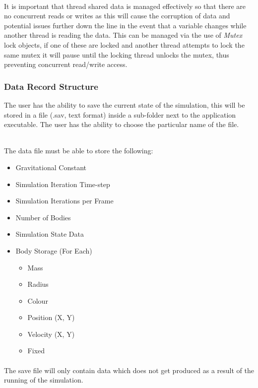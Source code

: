 \paragraph{}
It is important that thread shared data is managed effectively so that there are no concurrent reads or writes as this will cause the corruption of data and potential issues further down the line in the event that a variable changes while another thread is reading the data. This can be managed via the use of \textit{Mutex} lock objects, if one of these are locked and another thread attempts to lock the same mutex it will pause until the locking thread unlocks the mutex, thus preventing concurrent read/write access.

\subsubsection{Data Record Structure}
The user has the ability to save the current state of the simulation, this will be stored in a file (.sav, text format) inside a sub-folder next to the application executable. The user has the ability to choose the particular name of the file.\\\

The data file must be able to store the following:

\begin{itemize}
\item Gravitational Constant
\item Simulation Iteration Time-step
\item Simulation Iterations per Frame
\item Number of Bodies
\item Simulation State Data
\item Body Storage (For Each)
  \begin{itemize}
  \item Mass
  \item Radius
  \item Colour
  \item Position (X, Y)
  \item Velocity (X, Y)
  \item Fixed
  \end{itemize}
\end{itemize}

\paragraph{}
The save file will only contain data which does not get produced as a result of the running of the simulation. \\\

